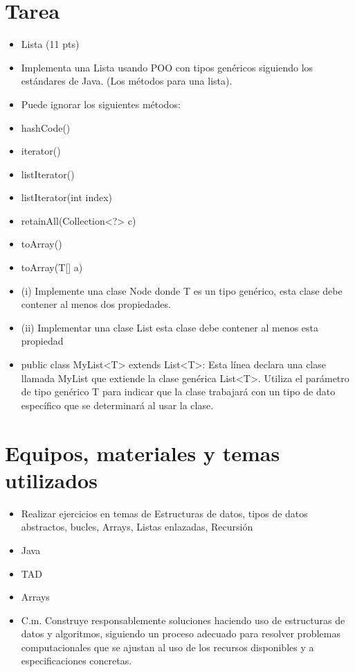 \documentclass{article}
\begin{document}
	\section{Tarea}
	\begin{itemize}		
		\item Lista (11 pts)
		\item Implementa una Lista usando POO con tipos genéricos siguiendo los estándares de Java. (Los métodos para una lista).
		\item Puede ignorar los siguientes métodos:
		\item hashCode()
		\item iterator()
		\item listIterator()
		\item listIterator(int index)
		\item retainAll(Collection<?> c)
		\item toArray()
		\item toArray(T[] a)
		\item (i) Implemente una clase Node donde T es un tipo genérico, esta clase debe contener al menos dos propiedades.
		\item (ii) Implementar una clase List esta clase debe contener al menos esta propiedad
		\item public class MyList<T> extends List<T>: Esta línea declara una clase llamada MyList que extiende la clase genérica List<T>. Utiliza el parámetro de tipo genérico T para indicar que la clase trabajará con un tipo de dato específico que se determinará al usar la clase.
		
	\end{itemize}
		
	\section{Equipos, materiales y temas utilizados}
	\begin{itemize}
		\item Realizar ejercicios en temas de Estructuras de datos, tipos de datos abstractos, bucles, Arrays, Listas enlazadas, Recursión
		\item Java
		\item TAD
		\item Arrays
		\item C.m. Construye responsablemente soluciones haciendo uso de estructuras de datos y algoritmos, siguiendo un proceso adecuado para resolver problemas computacionales que se ajustan al uso de los recursos disponibles y a especificaciones concretas.
		
	\end{itemize}
	
\end{document}
